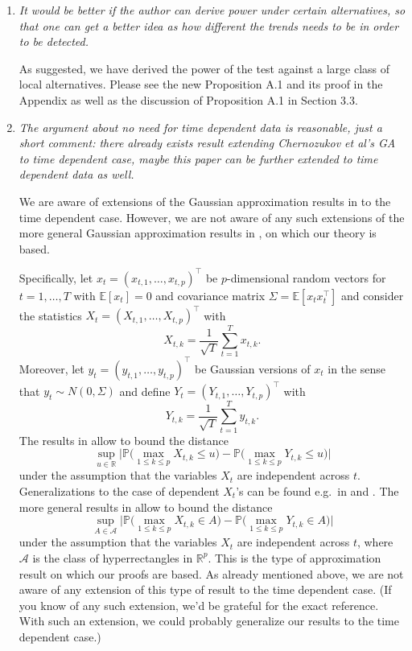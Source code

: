\documentclass[a4paper,12pt]{article}
\begin{document}
\begin{enumerate}[label=(\arabic*),leftmargin=0.7cm]
\begin{enumerate}[label=(\alph*),leftmargin=0.7cm]
\item \textit{It would be better if the author can derive power under certain alternatives, so that one can get a better idea as how different the trends needs to be in order to be detected.}

As suggested, we have derived the power of the test against a large class of local alternatives. Please see the new Proposition A.1 and its proof in the Appendix as well as the discussion of Proposition A.1 in Section 3.3.


\item \textit{The argument about no need for time dependent data is reasonable, just a short comment: there already exists result extending Chernozukov et al's GA to time dependent case, maybe this paper can be further extended to time dependent data as well.}

We are aware of extensions of the Gaussian approximation results in \cite{Chernozhukov2013} to the time dependent case. However, we are not aware of any such extensions of the more general Gaussian approximation results in \cite{Chernozhukov2017}, on which our theory is based. 

Specifically, let $x_t = (x_{t,1},\ldots,x_{t,p})^\top$ be $p$-dimensional random vectors for $t=1,\ldots,T$ with $\mathbb{E}[x_t] = 0$ and covariance matrix $\Sigma = \mathbb{E}[x_t x_t^\top]$ and consider the statistics $X_t = (X_{t,1},\ldots,X_{t,p})^\top$ with
\[ X_{t,k} = \frac{1}{\sqrt{T}} \sum_{t=1}^T x_{t,k}. \]
Moreover, let $y_t = (y_{t,1},\ldots,y_{t,p})^\top$ be Gaussian versions of $x_t$ in the sense that $y_t \sim N(0,\Sigma)$ and define $Y_t = (Y_{t,1},\ldots,Y_{t,p})^\top$ with
\[ Y_{t,k} = \frac{1}{\sqrt{T}} \sum_{t=1}^T y_{t,k}. \]
The results in \cite{Chernozhukov2013} allow to bound the distance
\[ \sup_{u \in \mathbb{R}} \Big| \mathbb{P} \big( \max_{1 \le k \le p} X_{t,k} \le u \big) - \mathbb{P} \big( \max_{1 \le k \le p} Y_{t,k} \le u \big) \Big| \]
under the assumption that the variables $X_t$ are independent across $t$. Generalizations to the case of dependent $X_t$'s can be found e.g.\ in \cite{ZhangWu2017} and \cite{ZhangCheng2018}. The more general results in \cite{Chernozhukov2017} allow to bound the distance 
\[ \sup_{A \in \mathcal{A}} \Big| \mathbb{P} \big( \max_{1 \le k \le p} X_{t,k} \in A \big) - \mathbb{P} \big( \max_{1 \le k \le p} Y_{t,k} \in A \big) \Big| \]
under the assumption that the variables $X_t$ are independent across $t$, where $\mathcal{A}$ is the class of hyperrectangles in $\mathbb{R}^p$. This is the type of approximation result on which our proofs are based. As already mentioned above, we are not aware of any extension of this type of result to the time dependent case. (If you know of any such extension, we'd be grateful for the exact reference. With such an extension, we could probably generalize our results to the time dependent case.) 
\end{enumerate}



\end{enumerate}
\end{document}
